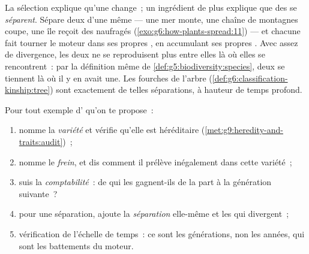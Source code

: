 \begin{proposition}\label{prop:g9:how-species-change:speciation}
La sélection explique qu'une  change~; un
ingrédient de plus explique que des  se
\emph{séparent}. Sépare deux  d'une même 
--- une mer monte, une chaîne de montagnes coupe, une île
reçoit des naufragés (\cref{exo:g6:how-plants-spread:11})
--- et chacune fait tourner le moteur dans ses propres
, en accumulant ses propres . Avec assez
de divergence, les deux ne se reproduisent plus entre elles
là où elles se rencontrent~: par la définition même de
\cref{def:g5:biodiversity:species}, deux  se
tiennent là où il y en avait une. Les fourches de l'arbre
(\cref{def:g6:classification-kinship:tree}) sont exactement
de telles séparations, à hauteur de temps profond.
\end{proposition}
\admitted

\begin{method}\label{met:g9:how-species-change:run}
Pour tout exemple d' qu'on te propose~:
\begin{enumerate}
  \item nomme la \emph{variété} et vérifie qu'elle est
        héréditaire
        (\cref{met:g9:heredity-and-traits:audit})~;
  \item nomme le \emph{frein}, et dis comment il prélève
        inégalement dans cette variété~;
  \item suis la \emph{comptabilité}~: de qui les 
        gagnent-ils de la part à la génération suivante~?
  \item pour une séparation, ajoute la \emph{séparation}
        elle-même et les  qui divergent~;
  \item vérification de l'échelle de temps~: ce sont les
        générations, non les années, qui sont les
        battements du moteur.
\end{enumerate}
\end{method}

